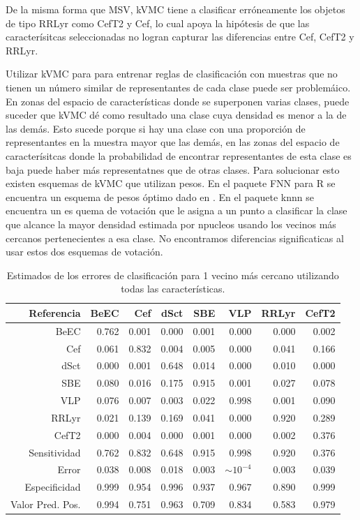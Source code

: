 \documentclass[letterpaper,12pt]{book}
\begin{document}
De la misma forma que MSV, kVMC tiene a clasificar erróneamente los objetos de tipo RRLyr como CefT2 y Cef, lo cual apoya la hipótesis de que las caracterísitcas seleccionadas no logran capturar las diferencias entre Cef, CefT2 y RRLyr. 

Utilizar kVMC para para entrenar reglas de clasificación con muestras que no tienen un número similar de representantes de cada clase puede ser problemáico. En zonas del espacio de características donde se superponen varias clases, puede suceder que kVMC dé como resultado una clase cuya densidad es menor a la de las demás. Esto sucede porque si hay una clase con una proporción de representantes en la muestra mayor que las demás, en las zonas del espacio de caracterísitcas donde la probabilidad de encontrar representantes de esta clase es baja puede haber más representatnes que de otras clases. Para solucionar esto existen esquemas de kVMC que utilizan pesos. En el paquete FNN para R se encuentra un esquema de pesos óptimo dado en . En el paquete knnn se encuentra un es quema de votación que le asigna a un punto a clasificar la clase que alcance la mayor densidad estimada por npucleos usando los vecinos más cercanos pertenecientes a esa clase. No encontramos diferencias significaticas al usar estos dos esquemas de votación. 

\begin{table}[ht]
  \centering
  \begin{tabular}{rrrrrrrr}
    \hline
    \hline
    Referencia& BeEC & Cef & dSct & SBE & VLP & RRLyr & CefT2 \\ 
    \hline
    \hline
    BeEC & 0.762 & 0.001 & 0.000 & 0.001 & 0.000 & 0.000 & 0.002 \\ 
    Cef & 0.061 & 0.832 & 0.004 & 0.005 & 0.000 & 0.041 & 0.166 \\ 
    dSct & 0.000 & 0.001 & 0.648 & 0.014 & 0.000 & 0.010 & 0.000 \\ 
    SBE & 0.080 & 0.016 & 0.175 & 0.915 & 0.001 & 0.027 & 0.078 \\ 
    VLP & 0.076 & 0.007 & 0.003 & 0.022 & 0.998 & 0.001 & 0.090 \\ 
    RRLyr & 0.021 & 0.139 & 0.169 & 0.041 & 0.000 & 0.920 & 0.289 \\ 
    CefT2 & 0.000 & 0.004 & 0.000 & 0.001 & 0.000 & 0.002 & 0.376 \\ 
    \hline
    \hline
    Sensitividad & 0.762 & 0.832 & 0.648 & 0.915 & 0.998 & 0.920 & 0.376 \\ 
    \hline
    Error & 0.038 & 0.008 & 0.018 & 0.003 & $\sim 10^{-4}$ & 0.003 & 0.039 \\ 
    \hline
    \hline
    Especificidad & 0.999 & 0.954 & 0.996 & 0.937 & 0.967 & 0.890 & 0.999 \\  
    \hline
    \hline
    Valor Pred. Pos. & 0.994 & 0.751 & 0.963 & 0.709 & 0.834 & 0.583 & 0.979 \\
    \hline
    \hline
  \end{tabular}
  \caption{Estimados de los errores de clasificación para 1 vecino más cercano utilizando todas las características.}
  \label{cuadro:resultadosKNN}
\end{table}
\end{document}
